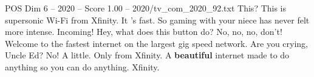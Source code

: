 \begin{textsample}{POS Dim 6 – 2020 – Score 1.00 – 2020/tv\_com\_2020\_92.txt}  \label{ex:f6_pos_045}
This?
This is supersonic Wi-Fi from Xfinity.
It 's fast.
So gaming with your niece has never felt more intense.
Incoming!
Hey, what does this button do?
No, no, no, don't!
Welcome to the fastest internet on the largest gig speed network.
Are you crying, Uncle Ed?
No!
A little.
Only from Xfinity.
A \textbf{beautiful} internet made to do anything so you can do anything.
Xfinity.

\end{textsample}
